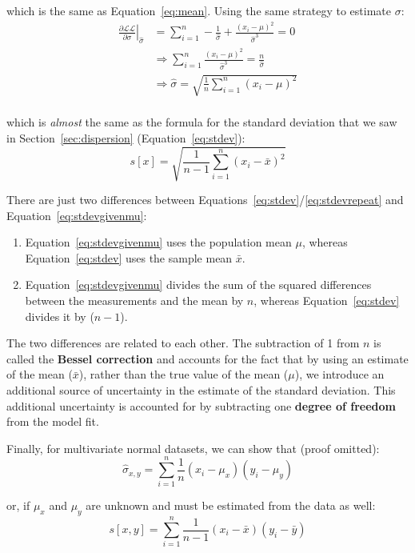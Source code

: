 \noindent which is the same as Equation~\ref{eq:mean}. Using the same
strategy to estimate $\sigma$:
\begin{equation}
  \label{eq:stdevgivenmu}
  \begin{split}
    \left.\frac{\partial{\mathcal{LL}}}{\partial{\sigma}}\right|_{\hat{\sigma}}
    & = \sum\limits_{i=1}^{n} - \frac{1}{\hat{\sigma}} +
    \frac{(x_i-\mu)^2}{\hat{\sigma}^3} = 0\\
    & \Rightarrow  \sum\limits_{i=1}^{n} \frac{(x_i-\mu)^2}{\hat{\sigma}^3} =
    \frac{n}{\hat{\sigma}} \\
    & \Rightarrow \hat{\sigma} =
    \sqrt{\frac{1}{n}\sum\limits_{i=1}^{n}(x_i-\mu)^2}\\
  \end{split}
\end{equation}

\noindent which is \emph{almost} the same as the formula for the
standard deviation that we saw in Section~\ref{sec:dispersion}
(Equation~\ref{eq:stdev}):
\begin{equation}
  s[x] = \sqrt{\frac{1}{n-1}\sum\limits_{i=1}^{n}(x_i-\bar{x})^2}
  \label{eq:stdevrepeat}
\end{equation}

There are just two differences between
Equations~\ref{eq:stdev}/\ref{eq:stdevrepeat} and
Equation~\ref{eq:stdevgivenmu}:
\begin{enumerate}
\item Equation~\ref{eq:stdevgivenmu} uses the population mean $\mu$,
  whereas Equation~\ref{eq:stdev} uses the sample mean $\bar{x}$.
\item Equation~\ref{eq:stdevgivenmu} divides the sum of the squared
  differences between the measurements and the mean by $n$, whereas
  Equation~\ref{eq:stdev} divides it by ($n-1$).
\end{enumerate}

The two differences are related to each other. The subtraction of 1
from $n$ is called the \textbf{Bessel correction} and accounts for the
fact that by using an estimate of the mean ($\bar{x}$), rather than
the true value of the mean ($\mu$), we introduce an additional source
of uncertainty in the estimate of the standard deviation. This
additional uncertainty is accounted for by subtracting one
\textbf{degree of freedom} from the model fit.\medskip

Finally, for multivariate normal datasets, we can show that (proof
omitted):
\begin{equation}
  \hat{\sigma}_{x,y} = \sum\limits_{i=1}^{n}\frac{1}{n}(x_i-\mu_x)(y_i-\mu_y)
\end{equation}

\noindent or, if $\mu_x$ and $\mu_y$ are unknown and must be estimated
from the data as well:
\begin{equation}
  s[x,y] = \sum\limits_{i=1}^{n}\frac{1}{n-1}(x_i-\bar{x})(y_i-\bar{y})
  \label{eq:sxy}
\end{equation}


